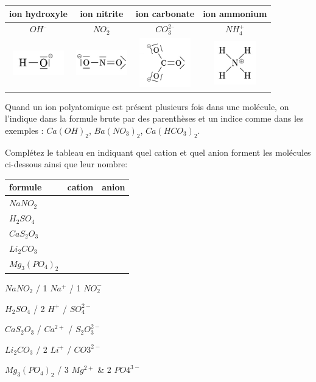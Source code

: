 \documentclass[
  11pt,
  french,
  a4paper,
  openany]{book}
\begin{document}
\begin{longtable}[]{@{}cccc@{}}
\toprule
ion hydroxyle & ion nitrite & ion carbonate & ion ammonium\tabularnewline
\midrule
\endhead
\(OH^–\) & \(NO_2^–\) & \(CO_3^{2–}\) & \(NH_4^+\)\tabularnewline
\includegraphics[width=6em,height=\textheight]{images/mol2D/OH-.png} & \includegraphics[width=6em,height=\textheight]{images/mol2D/NO2-.png} & \includegraphics[width=6em,height=\textheight]{images/mol2D/CO32-.png} & \includegraphics[width=5em,height=\textheight]{images/mol2D/NH4+.png}\tabularnewline
\bottomrule
\end{longtable}

Quand un ion polyatomique est présent plusieurs fois dans une molécule, on l'indique dans la formule brute par des parenthèses et un indice comme dans les exemples : \(Ca(OH)_2\), \(Ba(NO_3)_2\), \(Ca(HCO_3)_2\).

\begin{Exercise}
Complétez le tableau en indiquant quel cation et quel anion forment les molécules ci-dessous ainsi que leur nombre:

\end{Exercise}

\begin{longtable}[]{@{}lcc@{}}
\toprule
formule & cation & anion\tabularnewline
\midrule
\endhead
\(NaNO_2\) & &\tabularnewline
\(H_2SO_4\) & &\tabularnewline
\(CaS_2O_3\) & &\tabularnewline
\(Li_2CO_3\) & &\tabularnewline
\(Mg_3(PO_4)_2\) & &\tabularnewline
\bottomrule
\end{longtable}

\begin{Answer}
\(NaNO_2\) / 1 \(Na^+\) / 1 \(NO_2^-\)

\(H_2SO_4\) / 2 \(H^+\) / \(SO_4^{2-}\)

\(CaS_2O_3\) / \(Ca^{2+}\) / \(S_2O_3^{2-}\)

\(Li_2CO_3\) / 2 \(Li^+\) / \(CO3^{2-}\)

\(Mg_3(PO_4)_2\) / 3 \(Mg^{2+}\) \& 2 \(PO4^{3-}\)

\end{Answer}
\end{document}
